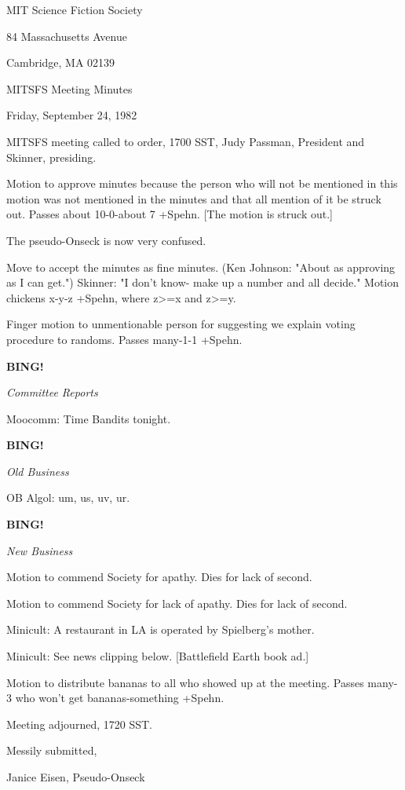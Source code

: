 \documentclass[12pt]{article}
\newcommand{\bing}{{\bf BING!} }
\newcommand{\goto}[1]{\bing \vskip 12pt \centerline{{\em{#1}}}}
\begin{document}
\begin{center}

MIT Science Fiction Society 

84 Massachusetts Avenue

Cambridge, MA 02139

\vspace{12pt}

MITSFS Meeting Minutes 

Friday, September 24, 1982

\end{center}
 
\vspace{18pt}

\setlength{\parskip}{6pt}

\noindent
MITSFS meeting called to order, 1700 SST,
Judy Passman, President and Skinner, presiding.

Motion to approve minutes because the person who will not be mentioned in this motion was not mentioned in the minutes and that all mention of it be struck out. Passes about 10-0-about 7 +Spehn. [The motion is struck out.]

The pseudo-Onseck is now very confused.

Move to accept the minutes as fine minutes. (Ken Johnson: "About as approving as I can get.") Skinner: "I don't know- make up a number and all decide." Motion chickens x-y-z +Spehn, where z>=x and z>=y.

Finger motion to unmentionable person for suggesting we explain voting procedure to randoms. Passes many-1-1 +Spehn.

\goto{Committee Reports}

Moocomm: Time Bandits tonight.

\goto{Old Business}

OB Algol: um, us, uv, ur.

\goto{New Business}

Motion to commend Society for apathy. Dies for lack of second.

Motion to commend Society for lack of apathy. Dies for lack of second.

Minicult: A restaurant in LA is operated by Spielberg's mother.

Minicult: See news clipping below. [Battlefield Earth book ad.]

Motion to distribute bananas to all who showed up at the meeting. Passes many-3 who won't get bananas-something +Spehn.

\vspace{12pt}

\noindent
Meeting adjourned, 1720 SST.

\vspace{18pt}

\centerline{Messily submitted,}
\centerline{Janice Eisen, Pseudo-Onseck}
\end{document}
